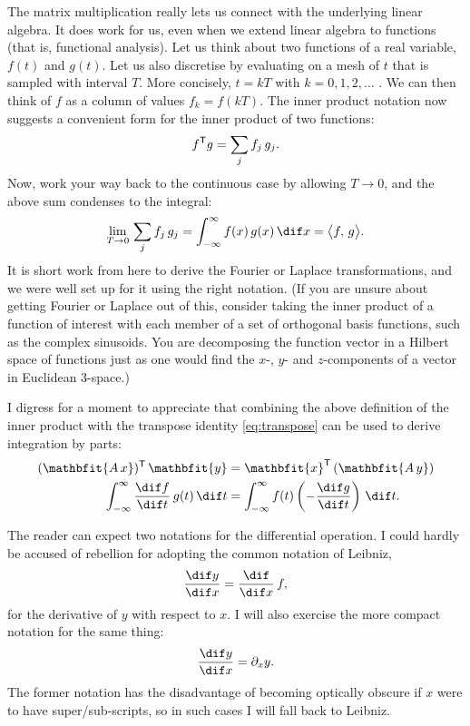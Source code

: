 The matrix multiplication really lets us connect with the underlying linear
algebra. It does work for us, even when we extend linear algebra to functions
(that is, functional analysis). Let us think about two functions of a real
variable, $f(t)$ and $g(t)$. Let us also discretise by evaluating on a mesh of
$t$ that is sampled with interval $T$. More concisely, $t = kT$ with
$k=0,1,2,\ldots$ . We can then think of $f$ as a column of values $f_k = f(kT)$.
The inner product notation now suggests a convenient form for the inner product
of two functions:
\[
  f^\mathsf{T} g = \sum_j f_j\, g_j.
\]
Now, work your way back to the continuous case by allowing $T\rightarrow 0$, and
the above sum condenses to the integral:
\[
  \lim_{T\rightarrow 0}\, \sum_j f_j\, g_j = \int_{-\infty}^\infty f(x)\, g(x)\,\dif x = \bigl<f,\, g\bigr>.
\]
It is short work from here to derive the Fourier or Laplace transformations, and
we were well set up for it using the right notation. (If you are unsure about
getting Fourier or Laplace out of this, consider taking the inner product of a
function of interest with each member of a set of orthogonal basis functions,
such as the complex sinusoids. You are decomposing the function vector in a
Hilbert space of functions just as one would find the $x$-, $y$- and
$z$-components of a vector in Euclidean 3-space.)

I digress for a moment to appreciate that combining the above definition of the
inner product with the transpose identity \eqref{eq:transpose} can be used to
derive integration by parts:
\begin{align*}
  (\mathbfit{A\,x})\tr\,\mathbfit{y} &= \mathbfit{x}\tr\,(\mathbfit{A\,y})\\
  \int_{-\infty}^\infty \diff{f}{t}\, g(t)\,\dif t &= \int_{-\infty}^\infty f(t)\left(-\diff{g}{t}\right)\,\dif t.
\end{align*}

The reader can expect two notations for the differential operation. I could
hardly be accused of rebellion for adopting the common notation of Leibniz,
\begin{equation*}
  \diff{y}{x} = \diff{}{x}\,f,
\end{equation*}
for the derivative of $y$ with respect to $x$. I will also exercise the more
compact notation for the same thing:
\begin{equation*}
  \diff{y}{x} = \pdop{x}{y}.
\end{equation*}
The former notation has the disadvantage of becoming optically obscure if $x$
were to have super/sub-scripts, so in such cases I will fall back to
Leibniz.

